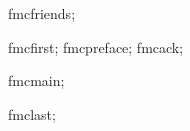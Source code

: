 







\LANG
\langi fmcfriends;

\langi fmcfirst;
\printshorttoc
\printlongtoc
\langi fmcpreface;
\langi fmcack;

\langi fmcmain;

\printpartpage{\appendicesname}
\printproofsappendix
\printhintsappendix
\printsolutionsappendix
\printcodeappendix

\printsymbolglossary
\printindexofnames
\printindexofterms
\langi fmclast;

\makereport

\bye
